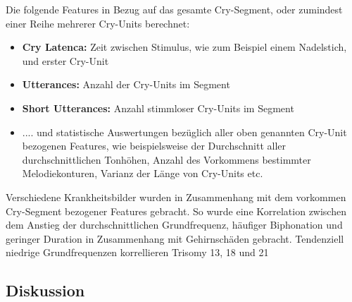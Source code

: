 Die folgende Features in Bezug auf das gesamte Cry-Segment, oder zumindest einer Reihe mehrerer Cry-Units berechnet:

\begin{itemize}
	\item \textbf{Cry Latenca: } Zeit zwischen Stimulus, wie zum Beispiel einem Nadelstich, und erster Cry-Unit
	\item \textbf{Utterances: } Anzahl der Cry-Units im Segment
	\item \textbf{Short Utterances: } Anzahl stimmloser Cry-Units im Segment
	\item .... und statistische Auswertungen bezüglich aller oben genannten Cry-Unit bezogenen Features, wie beispielsweise der Durchschnitt aller durchschnittlichen Tonhöhen, Anzahl des Vorkommens bestimmter Melodiekonturen, Varianz der Länge von Cry-Units etc.\cite[S. 85]{parentalPerception}
\end{itemize}

Verschiedene Krankheitsbilder wurden in Zusammenhang mit dem vorkommen Cry-Segment bezogener Features gebracht. So wurde eine Korrelation zwischen dem Anstieg der durchschnittlichen Grundfrequenz, häufiger Biphonation und geringer Duration in Zusammenhang mit Gehirnschäden gebracht. Tendenziell niedrige Grundfrequenzen korrellieren Trisomy 13, 18 und 21\cite[S. 85]{parentalPerception}

\subsection{Diskussion}

